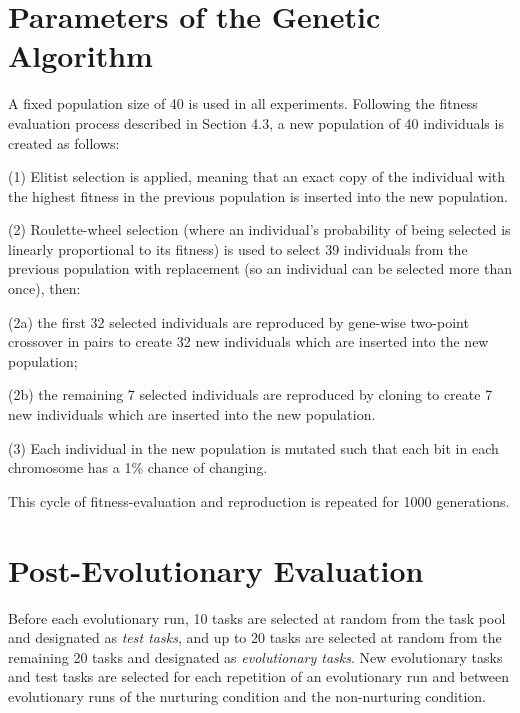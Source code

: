 \documentclass[master]{outhesis}
\begin{document}
\section{Parameters of the Genetic Algorithm}


A fixed population size of 40 is used in all experiments. Following the fitness evaluation process described in Section 4.3, a new population of 40 individuals is created as follows:

(1) Elitist selection is applied, meaning that an exact copy of the individual with the highest fitness in the previous population is inserted into the new population.

(2) Roulette-wheel selection (where an individual's probability of being selected is linearly proportional to its fitness) is used to select 39 individuals from the previous population with replacement (so an individual can be selected more than once), then:

(2a) the first 32 selected individuals are reproduced by gene-wise two-point crossover in pairs to create 32 new individuals which are inserted into the new population;

(2b) the remaining 7 selected individuals are reproduced by cloning to create 7 new individuals which are inserted into the new population.

(3) Each individual in the new population is mutated such that each bit in each chromosome has a 1\% chance of changing.

This cycle of fitness-evaluation and reproduction is repeated for 1000 generations.


\section{Post-Evolutionary Evaluation}

Before each evolutionary run, 10 tasks are selected at random from the task pool and designated as \emph{test tasks},
and up to 20 tasks are selected at random from the remaining 20 tasks and designated as \emph{evolutionary tasks}.
New evolutionary tasks and test tasks are selected for each repetition of an evolutionary run and between evolutionary runs of the nurturing condition and the non-nurturing condition.
\end{document}
